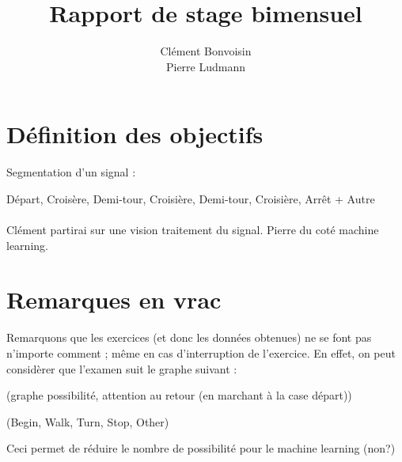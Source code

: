 \documentclass[11pt]{article}
\title{\textbf{Rapport de stage bimensuel}}
\author{Clément Bonvoisin\\Pierre Ludmann}
\begin{document}
\maketitle

\section{Définition des objectifs}

Segmentation d'un signal :

Départ, Croisère, Demi-tour, Croisière, Demi-tour, Croisière, Arrêt + Autre
\\\\
Clément partirai sur une vision traitement du signal.
Pierre du coté machine learning.
\section{Remarques en vrac}
Remarquons que les exercices (et donc les données obtenues) ne se font pas n'importe comment ; même en cas d'interruption de l'exercice.
En effet, on peut considèrer que l'examen suit le graphe suivant :

(graphe possibilité, attention au retour (en marchant à la case départ))

(Begin, Walk, Turn, Stop, Other)

Ceci permet de réduire le nombre de possibilité pour le machine learning (non?)
\end{document}
